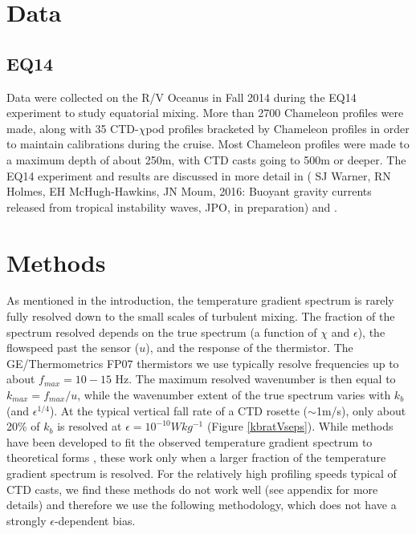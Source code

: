 \documentclass{ametsoc}
\begin{document}
\section{Data }

\subsection{EQ14}

Data were collected on the R/V Oceanus in Fall 2014 during the EQ14 experiment to study equatorial mixing.  More than 2700 Chameleon profiles were made, along with 35 CTD-$\chi$pod profiles bracketed by Chameleon profiles in order to maintain calibrations during the cruise. Most Chameleon profiles were made to a maximum depth of about 250m, with CTD casts going to 500m or deeper. The EQ14 experiment and results are discussed in more detail in ( SJ Warner, RN Holmes, EH McHugh-Hawkins, JN Moum, 2016: Buoyant gravity currents released from tropical instability waves, JPO, in preparation) and \cite{holmesetal2016}.



\section{Methods}


As mentioned in the introduction, the temperature gradient spectrum is rarely fully resolved down to the small scales of turbulent mixing. The fraction of the spectrum resolved depends on the true spectrum (a function of $\chi$ and $\epsilon$), the flowspeed past the sensor ($u$), and the response of the thermistor. The GE/Thermometrics FP07 thermistors we use typically resolve frequencies up to about $f_{max}=10-15$ Hz. The maximum resolved wavenumber is then equal to $k_{max}=f_{max}/u$, while the wavenumber extent of the true spectrum varies with $k_b$ (and $\epsilon^{1/4}$). At the typical vertical fall rate of a CTD rosette ($\sim$1m/s), only about 20\% of $k_b$ is resolved at $\epsilon=10^{-10}Wkg^{-1}$ (Figure \ref{kbratVseps}). While methods have been developed to fit the observed temperature gradient spectrum to theoretical forms \citep{ruddicketal00}, these work only when a larger fraction of the temperature gradient spectrum is resolved. For the relatively high profiling speeds typical of CTD casts, we find these methods do not work well (see appendix for more details) and therefore we use the following methodology, which does not have a strongly $\epsilon$-dependent bias.
\end{document}
